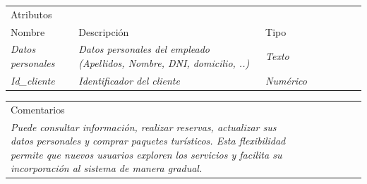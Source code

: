\begin{table}[H]
    \begin{tabular}{llllllll}
    \cline{1-3}
    \multicolumn{3}{|l|}{\cellcolor[HTML]{F2F2F2}Atributos}                                                                                                                                                                                                    &  &  &  &  &  \\ \cline{1-3}
    \multicolumn{1}{|l|}{Nombre}                                              & \multicolumn{1}{l|}{Descripción}                                                                               & \multicolumn{1}{l|}{Tipo}                                     &  &  &  &  &  \\ \cline{1-3}
    \multicolumn{1}{|l|}{{\color[HTML]{B7B7B7} \textit{Datos personales}}}      & \multicolumn{1}{p{10cm}|}{{\color[HTML]{B7B7B7} \textit{Datos personales del empleado (Apellidos, Nombre, DNI, domicilio, ..)}}} & \multicolumn{1}{l|}{{\color[HTML]{B7B7B7} \textit{Texto}}}    &  &  &  &  &  \\ \cline{1-3}
    \multicolumn{1}{|l|}{{\color[HTML]{B7B7B7} \textit{Id\_cliente}}}         & \multicolumn{1}{l|}{{\color[HTML]{B7B7B7} \textit{Identificador del cliente}}}                           & \multicolumn{1}{l|}{{\color[HTML]{B7B7B7} \textit{Numérico}}} &  &  &  &  &  \\ \cline{1-3}
    \end{tabular}
\end{table}

\begin{table}[H]
    \begin{tabular}{llllllll}
    \cline{1-1}
    \multicolumn{1}{|l|}{\cellcolor[HTML]{F2F2F2}Comentarios}                                                                                                                                                                                                                                                                      &  &  &  &  &  &  &  \\ \cline{1-1}
    \multicolumn{1}{|p{15cm}|}{{\color[HTML]{CCCCCC} \textit{Puede consultar información, realizar reservas, actualizar sus datos personales y comprar paquetes turísticos. Esta flexibilidad permite que nuevos usuarios exploren los servicios y facilita su incorporación al sistema de manera gradual.}}} &  &  &  &  &  &  &  \\ \cline{1-1}
    \end{tabular}
\end{table}




